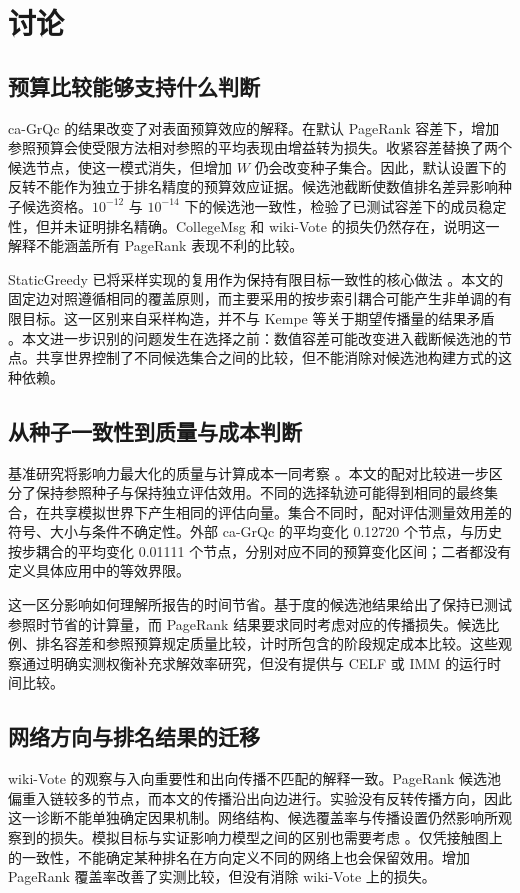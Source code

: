 \documentclass[smallextended]{svjour3}
\begin{document}
\section{讨论}
\subsection{预算比较能够支持什么判断}
ca-GrQc 的结果改变了对表面预算效应的解释。在默认 PageRank 容差下，增加参照预算会使受限方法相对参照的平均表现由增益转为损失。收紧容差替换了两个候选节点，使这一模式消失，但增加 $W$ 仍会改变种子集合。因此，默认设置下的反转不能作为独立于排名精度的预算效应证据。候选池截断使数值排名差异影响种子候选资格。$10^{-12}$ 与 $10^{-14}$ 下的候选池一致性，检验了已测试容差下的成员稳定性，但并未证明排名精确。CollegeMsg 和 wiki-Vote 的损失仍然存在，说明这一解释不能涵盖所有 PageRank 表现不利的比较。

StaticGreedy 已将采样实现的复用作为保持有限目标一致性的核心做法 \cite{ref8}。本文的固定边对照遵循相同的覆盖原则，而主要采用的按步索引耦合可能产生非单调的有限目标。这一区别来自采样构造，并不与 Kempe 等关于期望传播量的结果矛盾 \cite{ref1}。本文进一步识别的问题发生在选择之前：数值容差可能改变进入截断候选池的节点。共享世界控制了不同候选集合之间的比较，但不能消除对候选池构建方式的这种依赖。

\subsection{从种子一致性到质量与成本判断}
基准研究将影响力最大化的质量与计算成本一同考察 \cite{ref16}。本文的配对比较进一步区分了保持参照种子与保持独立评估效用。不同的选择轨迹可能得到相同的最终集合，在共享模拟世界下产生相同的评估向量。集合不同时，配对评估测量效用差的符号、大小与条件不确定性。外部 ca-GrQc 的平均变化 0.12720 个节点，与历史按步耦合的平均变化 0.01111 个节点，分别对应不同的预算变化区间；二者都没有定义具体应用中的等效界限。

这一区分影响如何理解所报告的时间节省。基于度的候选池结果给出了保持已测试参照时节省的计算量，而 PageRank 结果要求同时考虑对应的传播损失。候选比例、排名容差和参照预算规定质量比较，计时所包含的阶段规定成本比较。这些观察通过明确实测权衡补充求解效率研究，但没有提供与 CELF 或 IMM 的运行时间比较。

\subsection{网络方向与排名结果的迁移}
wiki-Vote 的观察与入向重要性和出向传播不匹配的解释一致。PageRank 候选池偏重入链较多的节点，而本文的传播沿出向边进行。实验没有反转传播方向，因此这一诊断不能单独确定因果机制。网络结构、候选覆盖率与传播设置仍然影响所观察到的损失。模拟目标与实证影响力模型之间的区别也需要考虑 \cite{ref15}。仅凭接触图上的一致性，不能确定某种排名在方向定义不同的网络上也会保留效用。增加 PageRank 覆盖率改善了实测比较，但没有消除 wiki-Vote 上的损失。
\end{document}
